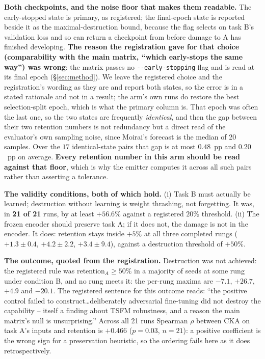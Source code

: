 \textbf{Both checkpoints, and the noise floor that makes them readable.} The
early-stopped state is primary, as registered; the final-epoch state is reported
beside it as the maximal-destruction bound, because the flag selects on task B's
validation loss and so can return a checkpoint from before damage to A has finished
developing.  \textbf{The reason the registration gave for that choice
(comparability with the main matrix, ``which early-stops the same way'') was
wrong}: the matrix passes no \texttt{-{}-early-stopping} flag and is read at its
final epoch (\S\ref{sec:method}).  We leave the registered choice and the
registration's wording as they are and report both states, so the error is in a
stated rationale and not in a result; the arm's own runs do restore the best
selection-split epoch, which is what the primary column is.  That epoch was
often the last one, so the two states are frequently \emph{identical}, and then the gap
between their two retention numbers is not redundancy but a direct read of the
evaluator's own sampling noise, since Moirai's forecast is the median of 20
samples.  Over the $17$ identical-state pairs that gap is at most $0.48$~pp and
$0.20$~pp on average.  \textbf{Every retention number in this arm should be read
against that floor}, which is why the emitter computes it across all such pairs
rather than asserting a tolerance.

\textbf{The validity conditions, both of which hold.} (i) Task B must actually be
learned; destruction without learning is weight thrashing, not forgetting. It
was, in \textbf{21 of 21} runs, by at least $+56.6\%$ against a registered $20\%$
threshold. (ii) The frozen encoder should preserve task A; if it does not, the
damage is not in the encoder. It does: retention stays inside $+5\%$ at all three
completed rungs ($+1.3\pm0.4$, $+4.2\pm2.2$, $+3.4\pm9.4$), against a destruction
threshold of $+50\%$.

\textbf{The outcome, quoted from the registration.} Destruction was not achieved:
the registered rule was retention$_A\!\geq\!50\%$ in a majority of seeds at some
rung under condition B, and no rung meets it: the per-rung maxima are $-7.1$,
$+26.7$, $+4.9$ and $-20.1$.  The registered sentence for this outcome reads:
``the positive control failed to construct\ldots deliberately adversarial
fine-tuning did not destroy the capability -- itself a finding about TSFM
robustness, and a reason the main matrix's null is unsurprising.''  Across all 21
runs Spearman $\rho$ between CKA on task A's inputs and retention is $+0.466$
($p{=}0.03$, $n{=}21$): a positive coefficient is the wrong sign for a
preservation heuristic, so the ordering fails here as it does retrospectively.

